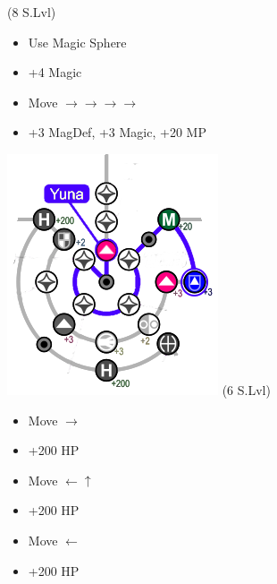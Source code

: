 \bothvfill\winvfill\lossvfill
\begin{spheregrid}
	\begin{itemize}
		\yunaf (8 S.Lvl)
		\begin{itemize}
			\item Use Magic Sphere
			\item +4 Magic
			\item Move $\rightarrow\rightarrow\rightarrow\rightarrow$
			\item +3 MagDef, +3 Magic, +20 MP
		\end{itemize}
		\includegraphics{graphics/Yuna_MRR_1}
		\kimahrif (6 S.Lvl)
		\begin{itemize}
			\item Move $\rightarrow$
			\item +200 HP
			\item Move $\leftarrow\uparrow$
			\item +200 HP
			\item Move $\leftarrow$
			\item +200 HP
		\end{itemize}

\end{itemize}
\end{spheregrid}
